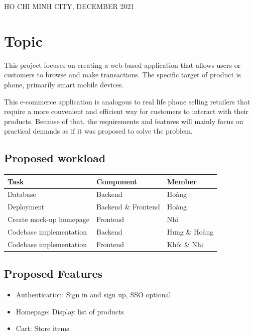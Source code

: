 \documentclass[a4paper]{article}
\numberwithin{equation}{section}
\begin{document}
\begin{titlepage}
  \begin{center}
    {\footnotesize HO CHI MINH CITY, DECEMBER 2021}
  \end{center}
\end{titlepage}

\tableofcontents
\newpage

\section{Topic}
This project focuses on creating a web-based application that allows users or customers to browse and make transactions.
The specific target of product is phone, primarily smart mobile devices.

This e-commerce application is analogous to real life phone selling retailers that require a more convenient and efficient way for customers to interact with their products.
Because of that, the requirements and features will mainly focus on practical demands as if it was proposed to solve the problem.

\subsection{Proposed workload}
\begin{center}
  \begin{tabular}{*{3}{l}}
    \toprule
    Task                    & Component           & Member        \\
    \midrule
    Database                & Backend             & Hoàng         \\
    Deployment              & Backend \& Frontend & Hoàng         \\
    Create mock-up homepage & Frontend            & Nhi           \\
    Codebase implementation & Backend             & Hưng \& Hoàng \\
    Codebase implementation & Frontend            & Khôi \& Nhi   \\
    \bottomrule
  \end{tabular}
\end{center}

\subsection{Proposed Features}
\begin{itemize}
  \item Authentication: Sign in and sign up, SSO optional
  \item Homepage: Display list of products
  \item Cart: Store items
\end{itemize}
\end{document}
